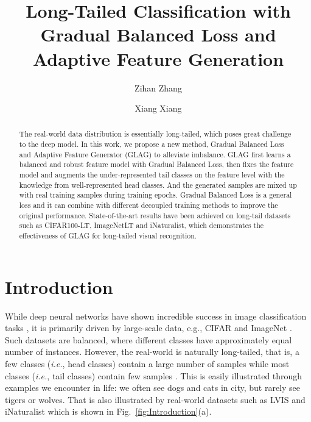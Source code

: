 \documentclass[runningheads]{llncs}
\begin{document}
\pagestyle{headings}
\mainmatter
\def\ECCVSubNumber{3084}  

\title{Long-Tailed Classification with Gradual Balanced Loss and Adaptive Feature Generation} 





\author{Zihan Zhang \and Xiang Xiang}

\maketitle

\begin{abstract}
The real-world data distribution is essentially long-tailed, which poses great challenge to the deep model. In this work, we propose a new method, Gradual Balanced Loss and Adaptive Feature Generator (GLAG) to alleviate imbalance. GLAG first learns a balanced and robust feature model with Gradual Balanced Loss, then fixes the feature model and augments the under-represented tail classes on the feature level with the knowledge from well-represented head classes. And the generated samples are mixed up with real training samples during training epochs. Gradual Balanced Loss is a general loss and it can combine with different decoupled training methods to improve the original performance. State-of-the-art results have been achieved on long-tail datasets such as CIFAR100-LT, ImageNetLT and iNaturalist, which demonstrates the effectiveness of GLAG for long-tailed visual recognition.




\end{abstract}


\section{Introduction}
While deep neural networks have shown incredible success in image classification tasks \cite{he2015delving}, it is primarily driven by large-scale data, e.g., CIFAR and ImageNet \cite{deng2009imagenet}. Such datasets are balanced, where different classes have approximately equal number of instances. However, the real-world is naturally long-tailed, that is, a few classes (\emph{i.e.}, head classes) contain a large number of samples while most classes (\emph{i.e.}, tail classes) contain few samples \cite{japkowicz2002class,zhang2021deep}. This is easily illustrated through examples we encounter in life: we often see dogs and cats in city, but rarely see tigers or wolves. That is also illustrated by real-world datasets such as LVIS \cite{gupta2019lvis} and iNaturalist \cite{van2018inaturalist} which is shown in Fig.~\ref{fig:Introduction}(a). 
\end{document}

